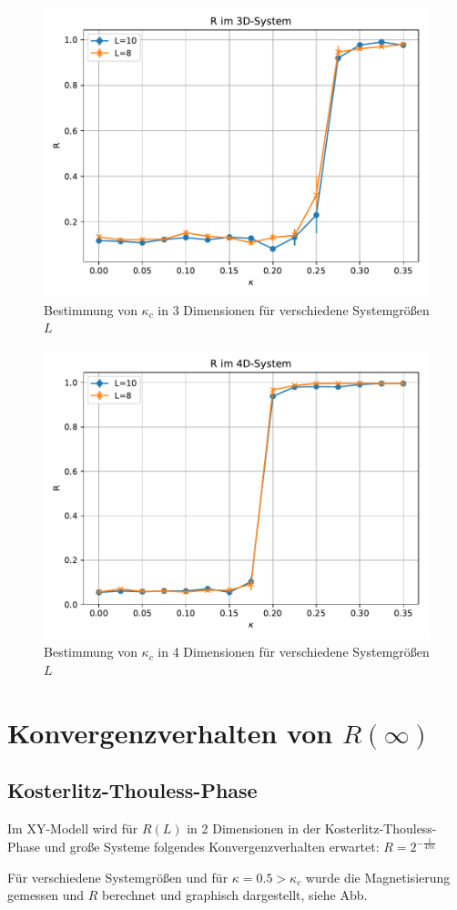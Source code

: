 \documentclass[10pt,a4paper]{article}
\begin{document}
\begin{figure}
  \centering
  \includegraphics[width=\textwidth]{../figures/3dR.pdf}
  \caption{Bestimmung von $\kappa_c$ in 3 Dimensionen für verschiedene Systemgrößen $L$}\label{fig:3d}
\end{figure}

\begin{figure}
  \centering
  \includegraphics[width=\textwidth]{../figures/4dR.pdf}
  \caption{Bestimmung von $\kappa_c$ in 4 Dimensionen für verschiedene Systemgrößen $L$}\label{fig:4d}
\end{figure}

\section{Konvergenzverhalten von $R(\infty)$}

\subsection{Kosterlitz-Thouless-Phase}
Im XY-Modell wird für $R(L)$ in 2 Dimensionen in der Kosterlitz-Thouless-Phase
und große Systeme folgendes Konvergenzverhalten erwartet:
$R= 2^{-\frac{1}{4\pi \kappa}}$

Für verschiedene Systemgrößen und für $\kappa=0.5>\kappa_c$ wurde die Magnetisierung
gemessen und $R$ berechnet und graphisch dargestellt, siehe Abb.
\end{document}
